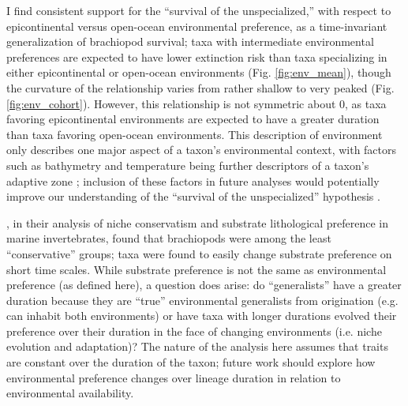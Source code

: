 \documentclass{article}
\begin{document}
I find consistent support for the ``survival of the unspecialized,'' with respect to epicontinental versus open-ocean environmental preference, as a time-invariant generalization of brachiopod survival; taxa with intermediate environmental preferences are expected to have lower extinction risk than taxa specializing in either epicontinental or open-ocean environments (Fig. \ref{fig:env_mean}), though the curvature of the relationship varies from rather shallow to very peaked (Fig. \ref{fig:env_cohort}). However, this relationship is not symmetric about 0, as taxa favoring epicontinental environments are expected to have a greater duration than taxa favoring open-ocean environments. This description of environment only describes one major aspect of a taxon's environmental context, with factors such as bathymetry and temperature being further descriptors of a taxon's adaptive zone \citep{Nurnberg2013a,Harnik2013,Harnik2011,Heim2011}; inclusion of these factors in future analyses would potentially improve our understanding of the ``survival of the unspecialized'' hypothesis \citep{Simpson1944}.

\citet{Hopkins2014a}, in their analysis of niche conservatism and substrate lithological preference in marine invertebrates, found that brachiopods were among the least ``conservative'' groups; taxa were found to easily change substrate preference on short time scales. While substrate preference is not the same as environmental preference (as defined here), a question does arise: do ``generalists'' have a greater duration because they are ``true'' environmental generalists from origination (e.g. can inhabit both environments) or have taxa with longer durations evolved their preference over their duration in the face of changing environments (i.e. niche evolution and adaptation)? The nature of the analysis here assumes that traits are constant over the duration of the taxon; future work should explore how environmental preference changes over lineage duration in relation to environmental availability.


\end{document}
